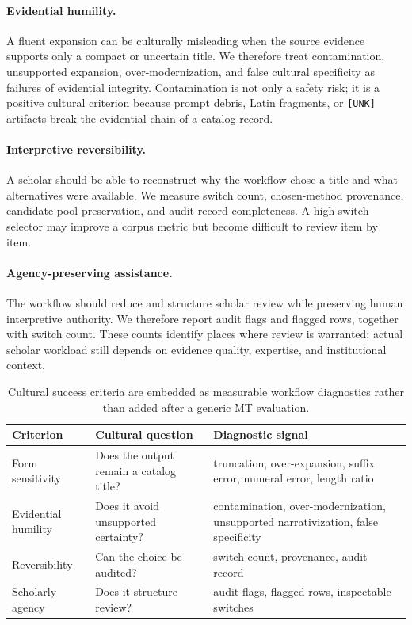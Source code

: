 \documentclass{article}
\begin{document}
\paragraph{Evidential humility.}
A fluent expansion can be culturally misleading when the source evidence supports only a compact or uncertain title. We therefore treat contamination, unsupported expansion, over-modernization, and false cultural specificity as failures of evidential integrity. Contamination is not only a safety risk; it is a positive cultural criterion because prompt debris, Latin fragments, or \texttt{[UNK]} artifacts break the evidential chain of a catalog record.

\paragraph{Interpretive reversibility.}
A scholar should be able to reconstruct why the workflow chose a title and what alternatives were available. We measure switch count, chosen-method provenance, candidate-pool preservation, and audit-record completeness. A high-switch selector may improve a corpus metric but become difficult to review item by item.

\paragraph{Agency-preserving assistance.}
The workflow should reduce and structure scholar review while preserving human interpretive authority. We therefore report audit flags and flagged rows, together with switch count. These counts identify places where review is warranted; actual scholar workload still depends on evidence quality, expertise, and institutional context.

\begin{table}[t]
\centering
\scriptsize
\begin{tabularx}{\columnwidth}{@{}p{}p{}X@{}}
\toprule
Criterion & Cultural question & Diagnostic signal \\
\midrule
Form sensitivity & Does the output remain a catalog title? & truncation, over-expansion, suffix error, numeral error, length ratio \\
Evidential humility & Does it avoid unsupported certainty? & contamination, over-modernization, unsupported narrativization, false specificity \\
Reversibility & Can the choice be audited? & switch count, provenance, audit record \\
Scholarly agency & Does it structure review? & audit flags, flagged rows, inspectable switches \\
\bottomrule
\end{tabularx}
\caption{Cultural success criteria are embedded as measurable workflow diagnostics rather than added after a generic MT evaluation.}
\label{tab:criteria}
\end{table}
\end{document}
